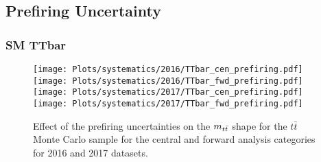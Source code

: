 \newpage


\subsection{Prefiring Uncertainty}
 \label{sec:PREFIRING_shapes}
 
 
\subsubsection*{SM TTbar}

\begin{figure}[!htbp]
\begin{center}
\texttt{[image: Plots/systematics/2016/TTbar\_cen\_prefiring.pdf]}
\texttt{[image: Plots/systematics/2016/TTbar\_fwd\_prefiring.pdf]} \\
\texttt{[image: Plots/systematics/2017/TTbar\_cen\_prefiring.pdf]}
\texttt{[image: Plots/systematics/2017/TTbar\_fwd\_prefiring.pdf]} \\
\caption{Effect of the prefiring uncertainties on the $m_{t\bar{t}}$ shape for the $t\bar{t}$ Monte Carlo sample for the central and forward analysis categories for 2016 and 2017 datasets.}
\label{fig:syst_prefiring_tt}
\end{center}
\end{figure}

\newpage
